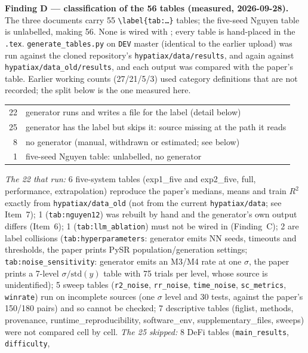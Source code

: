 \documentclass[11pt]{article}
\newcommand{\Rsq}{R^{2}}
\begin{document}
\textbf{Finding D --- classification of the 56 tables (measured, 2026-09-28).}
The three documents carry 55 \verb|\label|\texttt{\{tab:\dots\}} tables; the five-seed Nguyen table is
unlabelled, making 56. None is wired with \verb||; every table is hand-placed in the
\texttt{.tex}. \texttt{generate\_tables.py} on \texttt{DEV} master (identical to the earlier
upload) was run against the cloned repository's \texttt{hypatiax/data/results}, and again against
\texttt{hypatiax/data\_old/results}, and each output was compared with the paper's table.
Earlier working counts (27/21/5/3) used category definitions that are not recorded; the split
below is the one measured here.
\begin{center}\small
\begin{tabular}{rl}
\toprule
22 & generator runs and writes a file for the label (detail below) \\
25 & generator has the label but skips it: source missing at the path it reads \\
 8 & no generator (manual, withdrawn or estimated; see below) \\
 1 & five-seed Nguyen table: unlabelled, no generator \\
\bottomrule
\end{tabular}
\end{center}
\emph{The 22 that run:} 6 five-system tables (exp1\_five and exp2\_five, full, performance,
extrapolation) reproduce the paper's medians, means and train $\Rsq$ exactly from
\texttt{hypatiax/data\_old} (not from the current \texttt{hypatiax/data}; see Item~7);
1 (\texttt{tab:nguyen12}) was rebuilt by hand and the generator's own output differs (Item~6);
1 (\texttt{tab:llm\_ablation}) must not be wired in (Finding~C); 2 are label collisions
(\texttt{tab:hyperparameters}: generator emits NN seeds, timeouts and thresholds, the paper
prints PySR population/generation settings; \texttt{tab:noise\_sensitivity}: generator emits an
M3/M4 rate at one $\sigma$, the paper prints a 7-level $\sigma/\mathrm{std}(y)$ table with 75
trials per level, whose source is unidentified); 5 sweep tables (\texttt{r2\_noise},
\texttt{rr\_noise}, \texttt{time\_noise}, \texttt{sc\_metrics}, \texttt{winrate}) run on
incomplete sources (one $\sigma$ level and 30 tests, against the paper's 150/180 pairs) and so
cannot be checked; 7 descriptive tables (figlist, methods, provenance, runtime\_reproducibility,
software\_env, supplementary\_files, sweeps) were not compared cell by cell.
\emph{The 25 skipped:} 8 DeFi tables (\texttt{main\_results}, \texttt{difficulty},
\end{document}
